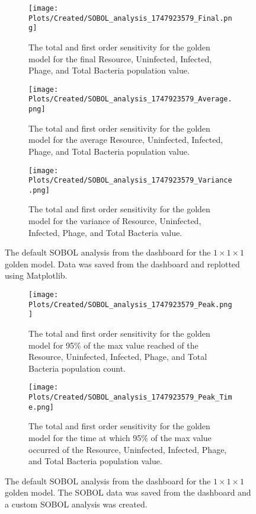 \begin{figure}
    \centering
    \begin{subfigure}{0.49\linewidth}
        \centering
        \captionsetup{width=1\linewidth}
        \texttt{[image: Plots/Created/SOBOL\_analysis\_1747923579\_Final.png]}
        \caption{
            The total and first order sensitivity for the golden model for the final Resource, Uninfected, Infected, Phage, and Total Bacteria population value. 
        }
        \label{fig:created:SOBOL_final}
    \end{subfigure}
    \hfill
    \begin{subfigure}{0.49\linewidth}
        \centering
        \captionsetup{width=1\linewidth}
        \texttt{[image: Plots/Created/SOBOL\_analysis\_1747923579\_Average.png]}
        \caption{
            The total and first order sensitivity for the golden model for the average Resource, Uninfected, Infected, Phage, and Total Bacteria population value. 
        }
        \label{fig:created:SOBOL_average}
    \end{subfigure}
    \hfill
    \begin{subfigure}{0.49\linewidth}
        \centering
        \captionsetup{width=1\linewidth}
        \texttt{[image: Plots/Created/SOBOL\_analysis\_1747923579\_Variance.png]}
        \caption{
            The total and first order sensitivity for the golden model for the variance of Resource, Uninfected, Infected, Phage, and Total Bacteria value. 
        }
        \label{fig:created:SOBOL_variance}
    \end{subfigure}
    \caption{The default SOBOL analysis from the dashboard for the $1\times 1 \times 1$ golden model. Data was saved from the dashboard and replotted using Matplotlib.}
\end{figure}


\begin{figure}
    \centering
    \begin{subfigure}{0.49\linewidth}
        \centering
        \captionsetup{width=1\linewidth}
        \texttt{[image: Plots/Created/SOBOL\_analysis\_1747923579\_Peak.png]}
        \caption{
            The total and first order sensitivity for the golden model for 95\% of the max value reached of the Resource, Uninfected, Infected, Phage, and Total Bacteria population count. 
        }
        \label{fig:created:SOBOL_peak}
    \end{subfigure}
    \hfill
    \begin{subfigure}{0.49\linewidth}
        \centering
        \captionsetup{width=1\linewidth}
        \texttt{[image: Plots/Created/SOBOL\_analysis\_1747923579\_Peak\_Time.png]}
        \caption{
            The total and first order sensitivity for the golden model for the time at which 95\% of the max value occurred of the Resource, Uninfected, Infected, Phage, and Total Bacteria population value. 
        }
        \label{fig:created:SOBOL_peak_time}
    \end{subfigure}
    \caption{The default SOBOL analysis from the dashboard for the $1\times 1 \times 1$ golden model. The SOBOL data was saved from the dashboard and a custom SOBOL analysis was created. }
\end{figure}
